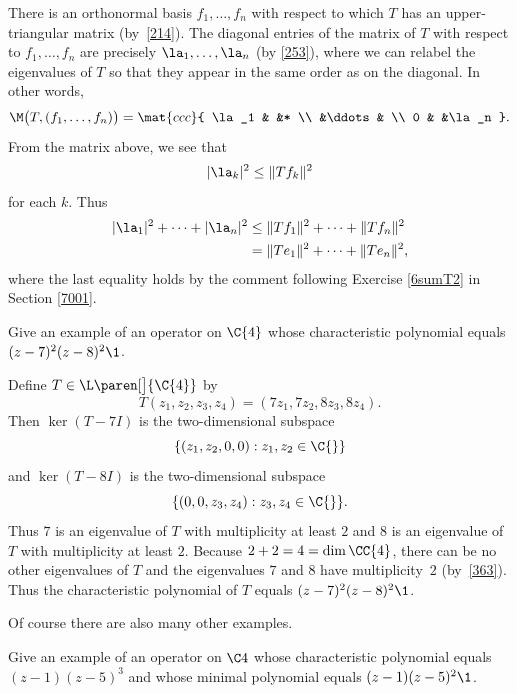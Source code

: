\begin{Solution}
There is an orthonormal basis $f_1, \dots, f_n$ with respect to which $T$ has
an upper-triangular matrix (by~\ref{214}).  The diagonal entries of the matrix of
$T$ with respect to $f_1, \dots, f_n$ are precisely $\la_1, \dots, \la_n$
(by \ref{253}), where we can relabel the eigenvalues of $T$ so that they appear
in the same order as on the diagonal.  In other words,
\[
\M\bigl(T, (f_1, \dots, f_n) \bigr)
= \mat{ccc}{ \la_1 & &* \\ &\ddots & \\ 0 & &\la_n }.
\]
{}From the matrix above, we see that
\[
|\la_k|^2 \le \|Tf_k\|^2
\]
for each $k$.  Thus
\begin{align*}
|\la_1|^2 + \dots + |\la_n|^2 &\le \|Tf_1\|^2 + \dots + \|Tf_n\|^2 \\
&=  \|Te_1\|^2 + \dots + \|Te_n\|^2,
\end{align*}
where the last equality holds by the comment following Exercise \ref{6sumT2} in Section \ref{7001}.
\end{Solution}

\exercise
Give an example of an operator on $\C{4}$ whose characteristic
polynomial equals $(z - 7)^2 (z - 8)^2\1$.

\begin{Solution}
Define $T \in \L\paren[\big]{\C{4}}$ by
\[
T(z_1, z_2, z_3, z_4) = (7z_1, 7z_2, 8z_3, 8z_4).
\]
Then $\ker (T - 7I)$ is the two-dimensional subspace
\[
\{(z_1, z_2, 0, 0): z_1, z_2 \in \C{} \}
\]
and
$\ker (T - 8I)$ is the two-dimensional subspace
\[
\{(0, 0, z_3, z_4): z_3, z_4 \in \C{} \}.
\]
Thus $7$ is an eigenvalue of $T$ with multiplicity at least $2$ and $8$ is an
eigenvalue of $T$ with multiplicity at least $2$.  Because
$2 + 2 = 4 = \dim \CC{4}$, there can be no other eigenvalues of $T$ and the
eigenvalues $7$ and $8$ have multiplicity~$2$ (by~\ref{363}).  Thus the
characteristic polynomial of $T$ equals $(z - 7)^2 (z - 8)^2\1$.

Of course there are also many other examples.
\end{Solution}

\exercise
Give an example of an operator on $\C4$ whose characteristic
polynomial equals $(z - 1) (z - 5)^3$ and whose minimal polynomial equals
$(z - 1) (z - 5)^2\1$.

